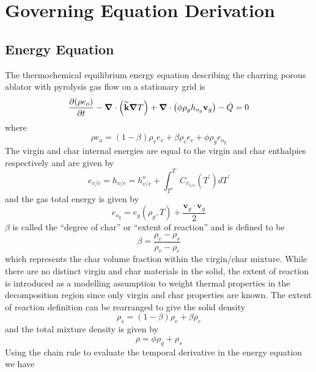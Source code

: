\section{Governing Equation Derivation}
\subsection{Energy Equation}
The thermochemical equilibrium energy equation describing the charring porous ablator with pyrolysis gas flow on a stationary grid is
\begin{equation}
  {\frac{\partial{\left(\rho e_{o} \right)}}{\partial{t}}} - {\boldsymbol{\nabla}} {}\cdot\left(\widetilde{\textbf{k}} {\boldsymbol{\nabla}} {T}\right) + {\boldsymbol{\nabla}} {}\cdot\left(\phi \rho_g h_{o_{g}} \textbf{v}_g \right) - \dot{Q}= 0
\end{equation}
where
\begin{equation}
  \rho e_{o} = \left(1-\beta\right)\rho_{v}e_{v}+\beta\rho_{c}e_{c}+\phi\rho_{g}e_{o_{g}}
\end{equation}
The virgin and char internal energies are equal to the virgin and char enthalpies respectively and are given by
\begin{equation}
  e_{v/c} = h_{v/c} = h_{v/c}^{o} + \int_{T^{o}}^{T} C_{v_{v/c}}\left(T^{\prime}\right)dT^{\prime}
\end{equation}
and the gas total energy is given by
\begin{equation}
  e_{o_{g}} = e_{g}\left(\rho_{g},T\right) + \frac{\mathbf{v}_{g} \cdot \mathbf{v}_{g}}{2}
\end{equation}
$\beta$ is called the ``degree of char'' or ``extent of reaction'' and is defined to be
\begin{equation}
  \beta =\frac{\rho _{v}-\rho _{s}}{\rho _{v}-\rho _{c}}
\end{equation}
which represents the char volume fraction within the virgin/char mixture.  While there are no distinct virgin and char materials in the solid, the extent of reaction is introduced as a modelling assumption to weight thermal properties in the decomposition region since only virgin and char properties are known.
The extent of reaction definition can be rearranged to give the solid density
\begin{equation}
  \rho _{s}=\left( 1-\beta \right) \rho _{v}+\beta \rho _{c}
\end{equation}%
and the total mixture density is given by
\begin{equation}
\rho =\phi \rho _{g}+\rho _{s}  
\end{equation}
Using the chain rule to evaluate the temporal derivative in the energy equation we have
